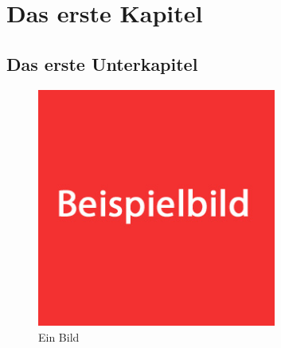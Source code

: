 \section{Das erste Kapitel}
\subsection{Das erste Unterkapitel}

\begin{figure}[htbp]
	\centering
  \includegraphics[width=0.7\textwidth]{images/test.jpg}
	\caption{Ein Bild}
	\label{fig1}
\end{figure}
